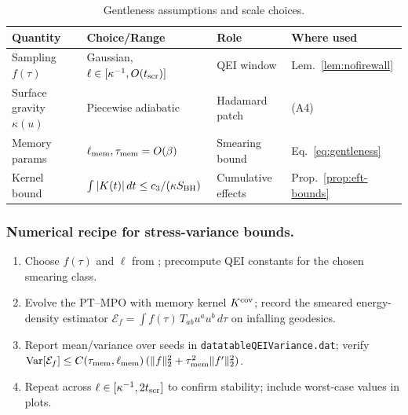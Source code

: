 \documentclass[aps,prd,preprint,onecolumn,superscriptaddress,nofootinbib,longbibliography,floatfix,11pt,showpacs,showkeys]{revtex4-2}
\theoremstyle{plain}
\theoremstyle{definition}
\theoremstyle{remark}
\begin{document}
\begin{table}[t]
\centering
\caption{Gentleness assumptions and scale choices.}
\label{tab:gentleness-assumptions}
\footnotesize
\begin{tabular*}{\textwidth}{@{\extracolsep{\fill}}llll@{}}
\toprule
Quantity & Choice/Range & Role & Where used \\\midrule
Sampling $f(\tau)$ & Gaussian, $\ell\in[\kappa^{-1},O(t_{\rm scr})]$ & QEI window & Lem.~\ref{lem:nofirewall} \\
Surface gravity $\kappa(u)$ & Piecewise adiabatic & Hadamard patch & (A4) \\
Memory params & $\ell_{\rm mem},\tau_{\rm mem}=O(\beta)$ & Smearing bound & Eq.~\eqref{eq:gentleness} \\
Kernel bound & $\int |K(t)|\,dt \le c_3/(\kappa S_{\rm BH})$ & Cumulative effects & Prop.~\ref{prop:eft-bounds} \\\bottomrule
\end{tabular*}
\end{table}

\subsubsection{Numerical recipe for stress-variance bounds.}
\begin{enumerate}[leftmargin=*]
\item Choose $f(\tau)$ and $\ell$ from ; precompute QEI constants for the chosen smearing class.
\item Evolve the PT--MPO with memory kernel $K^{\rm cov}$; record the smeared energy-density estimator
$\mathcal{E}_f=\int f(\tau)\,T_{ab}u^au^b\,d\tau$ on infalling geodesics.
\item Report mean/variance over seeds in \texttt{datatableQEIVariance.dat}; verify $\mathrm{Var}[\mathcal{E}_f]\le C(\tau_{\rm mem},\ell_{\rm mem})\,(\|f\|_2^2+\tau_{\rm mem}^2\|f'\|_2^2)$.
\item Repeat across $\ell\in[\kappa^{-1},2t_{\rm scr}]$ to confirm stability; include worst-case values in plots.
\end{enumerate}
\end{document}
